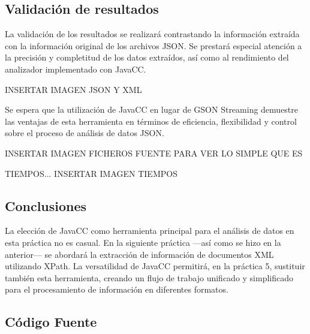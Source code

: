 \subsection{Validación de resultados}

La validación de los resultados se realizará contrastando la información extraída con la información original de los archivos JSON. Se prestará especial atención a la precisión y completitud de los datos extraídos, así como al rendimiento del analizador implementado con JavaCC.

INSERTAR IMAGEN JSON Y XML

Se espera que la utilización de JavaCC en lugar de GSON Streaming demuestre las ventajas de esta herramienta en términos de eficiencia, flexibilidad y control sobre el proceso de análisis de datos JSON.

INSERTAR IMAGEN FICHEROS FUENTE PARA VER LO SIMPLE QUE ES

TIEMPOS...
INSERTAR IMAGEN TIEMPOS



\subsection{Conclusiones}



La elección de JavaCC como herramienta principal para el análisis de datos en esta práctica no es casual. En la siguiente práctica ---así como se hizo en la anterior--- se abordará la extracción de información de documentos XML utilizando XPath. La versatilidad de JavaCC permitirá, en la práctica 5, sustituir también esta herramienta, creando un flujo de trabajo unificado y simplificado para el procesamiento de información en diferentes formatos.

\subsection{Código Fuente}

